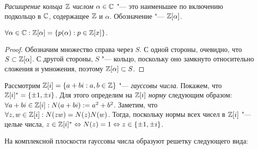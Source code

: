 \begin{definition}
	\textit{Расширение кольца $\mathbb{Z}$ числом $\alpha \in \mathbb{C}$} "--- это наименьшее по включению подкольцо в $\mathbb{C}$, содержащее $\mathbb{Z}$ и $\alpha$. Обозначение "--- $\mathbb{Z}[\alpha]$.
\end{definition}

\begin{proposition}
	$\forall \alpha \in \mathbb{C}: \mathbb{Z}[\alpha] = \{p(\alpha): p \in \mathbb{Z}[x]\}$.
\end{proposition}

\begin{proof}
	Обозначим множество справа через $S$. С одной стороны, очевидно, что $S \subset \mathbb{Z}[\alpha]$. С другой стороны, $S$ "--- кольцо, поскольку оно замкнуто относительно сложения и умножения, поэтому $\mathbb{Z}[\alpha] \subset S$.
\end{proof}

\begin{example}
	Рассмотрим $\mathbb{Z}[i] = \{a + bi: a, b \in \mathbb{Z}\}$ "--- \textit{гауссовы числа}. Покажем, что $\Z[i]^* \hm= \{\pm1, \pm i\}$. Для этого определим на $\mathbb{Z}[i]$ \textit{норму} следующим образом: $\forall a + bi \in \mathbb{Z}[i]: N(a + bi) := a^2 + b^2$. Заметим, что $\forall z, w \in \mathbb{Z}[i]: N(zw) = N(z)N(w)$. Тогда, поскольку нормы всех чисел в $\mathbb{Z}[i]$ "--- целые числа, $z \in \mathbb{Z}[i]^* \Leftrightarrow N(z) = 1 \Leftrightarrow z \in \{\pm1, \pm i\}$.
	
	\pagebreak
	На комплексной плоскости гауссовы числа образуют решетку следующего вида:
	\begin{center}
	\end{center}
\end{example}

